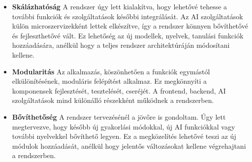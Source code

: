 \begin{itemize}
    \item \textbf{Skálázhatóság}
    A rendszer úgy lett kialakítva, hogy lehetővé tehesse a további funkciók és szolgáltatások későbbi integrálását. Az AI szolgáltatások külön microszervizekként lettek elkészítve, így a rendszer könnyen bővíthetővé és fejleszthetővé vált. \cite{fowlerMicroservices} Ez lehetőség az új modellek, nyelvek, tanulási funkciók hozzáadására, anélkül hogy a teljes rendszer architektúráján módosítani kellene.

    \item \textbf{Modularitás}
    Az alkalmazás, köszönhetően a funkciók egymástól elkülönítésének, moduláris felépítést alkalmaz. Ez megkönnyíti a komponensek fejlesztését, tesztelését, cseréjét. A frontend, backend, AI szolgáltatások mind különálló részekként működnek a rendszerben.

    \item \textbf{Bővíthetőség}
    A rendszer tervezésénél a jövőre is gondoltam. Úgy lett megtervezve, hogy később új gyakorlási módokkal, új AI funkciókkal vagy további nyelvekkel bővíthető legyen. Ez a megközelítés lehetővé teszi az új módulok hozzáadását, anélkül hogy jelentős változásokat kellene végrehajtani a rendszerben.
    
\end{itemize}
